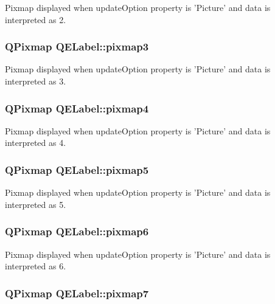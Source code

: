 Pixmap displayed when updateOption property is 'Picture' and data is interpreted as 2. \hypertarget{classQELabel_a57180f761e931d984882e18a696feda7}{
\subsubsection[{pixmap3}]{\setlength{\rightskip}{0pt plus 5cm}QPixmap QELabel::pixmap3}}
\label{classQELabel_a57180f761e931d984882e18a696feda7}
Pixmap displayed when updateOption property is 'Picture' and data is interpreted as 3. \hypertarget{classQELabel_ad7454834a438e24744fbaca27cf75f80}{
\subsubsection[{pixmap4}]{\setlength{\rightskip}{0pt plus 5cm}QPixmap QELabel::pixmap4}}
\label{classQELabel_ad7454834a438e24744fbaca27cf75f80}
Pixmap displayed when updateOption property is 'Picture' and data is interpreted as 4. \hypertarget{classQELabel_a059f6c9e30a31cb7783223bfb5961ed7}{
\subsubsection[{pixmap5}]{\setlength{\rightskip}{0pt plus 5cm}QPixmap QELabel::pixmap5}}
\label{classQELabel_a059f6c9e30a31cb7783223bfb5961ed7}
Pixmap displayed when updateOption property is 'Picture' and data is interpreted as 5. \hypertarget{classQELabel_aef12b4be5226b9e2660b69873f029122}{
\subsubsection[{pixmap6}]{\setlength{\rightskip}{0pt plus 5cm}QPixmap QELabel::pixmap6}}
\label{classQELabel_aef12b4be5226b9e2660b69873f029122}
Pixmap displayed when updateOption property is 'Picture' and data is interpreted as 6. \hypertarget{classQELabel_a65da0ef3bc0c5f289070763c7c794e77}{
\subsubsection[{pixmap7}]{\setlength{\rightskip}{0pt plus 5cm}QPixmap QELabel::pixmap7}}
